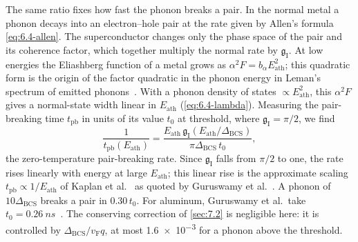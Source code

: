 The same ratio fixes how fast the phonon breaks a pair. In the normal metal a phonon decays into an electron--hole pair at the rate given by Allen's formula \cref{eq:6.4-allen}. The superconductor changes only the phase space of the pair and its coherence factor, which together multiply the normal rate by $\mathfrak{g}_{\mathrm{I}}$. At low energies the Eliashberg function of a metal grows as $\alpha^2F = b_\alpha E_{\mathrm{ath}}^2$; this quadratic form is the origin of the factor quadratic in the phonon energy in Leman's spectrum of emitted phonons~\cite[Sect.~IV]{leman2012invited}. With a phonon density of states $\propto E_{\mathrm{ath}}^2$, this $\alpha^2F$ gives a normal-state width linear in $E_{\mathrm{ath}}$ (\cref{eq:6.4-lambda}). Measuring the pair-breaking time $t_{\mathrm{pb}}$ in units of its value $t_0$ at threshold, where $\mathfrak{g}_{\mathrm{I}} = \pi/2$, we find
\begin{equation}
  \frac{1}{t_{\mathrm{pb}}(E_{\mathrm{ath}})} = \frac{E_{\mathrm{ath}}\,\mathfrak{g}_{\mathrm{I}}(E_{\mathrm{ath}}/\Delta_{\mathrm{BCS}})}{\pi\Delta_{\mathrm{BCS}}\,t_0} ,
  \label{eq:20.4-tpb}
\end{equation}
the zero-temperature pair-breaking rate. Since $\mathfrak{g}_{\mathrm{I}}$ falls from $\pi/2$ to one, the rate rises linearly with energy at large $E_{\mathrm{ath}}$; this linear rise is the approximate scaling $t_{\mathrm{pb}} \propto 1/E_{\mathrm{ath}}$ of Kaplan et al.~\cite{kaplan1976quasiparticle} as quoted by Guruswamy et al.~\cite[p.~5]{guruswamy2014quasiparticle}. A phonon of $10\Delta_{\mathrm{BCS}}$ breaks a pair in $0.30\,t_0$. For aluminum, Guruswamy et al.\ take $t_0 = \SI{0.26}{ns}$~\cite[p.~3]{guruswamy2014quasiparticle}. The conserving correction of \cref{sec:7.2} is negligible here: it is controlled by $\Delta_{\mathrm{BCS}}/v_{\mathrm{F}}q$, at most \num{1.6e-3} for a phonon above the threshold.

